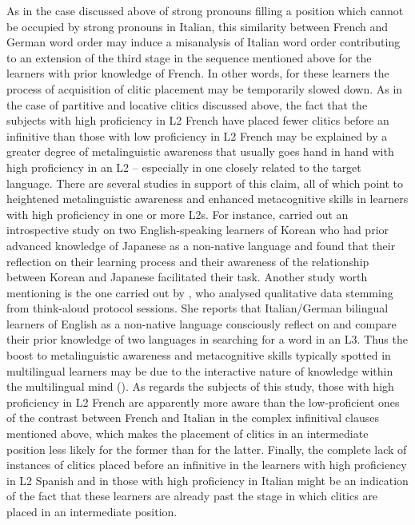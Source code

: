 \documentclass[output=paper,modfonts,nonflat,newtxmath]{langsci/langscibook}
\begin{document}
As in the case discussed above of strong pronouns filling a position which cannot be occupied by strong pronouns in Italian, this similarity between French and German word order may induce a misanalysis of Italian word order contributing to an extension of the third stage in the sequence mentioned above for the learners with prior knowledge of French. In other words, for these learners the process of acquisition of clitic placement may be temporarily slowed down. As in the case of partitive and locative clitics discussed above, the fact that the subjects with high proficiency in L2 French have placed fewer clitics before an infinitive than those with low proficiency in L2 French may be explained by a greater degree of metalinguistic awareness that usually goes hand in hand with high proficiency in an L2 – especially in one closely related to the target language. There are several studies in support of this claim, all of which point to heightened metalinguistic awareness and enhanced metacognitive skills in learners with high proficiency in one or more L2s. For instance, \citet{Fouser2001} carried out an introspective study on two English-speaking learners of Korean who had prior advanced knowledge of Japanese as a non-native language and found that their reflection on their learning process and their awareness of the relationship between Korean and Japanese facilitated their task. Another study worth mentioning is the one carried out by \citet{Jessner1999}, who analysed qualitative data stemming from think-aloud protocol sessions. She reports that Italian/German bilingual learners of English as a non-native language consciously reflect on and compare their prior knowledge of two languages in searching for a word in an L3. Thus the boost to metalinguistic awareness and metacognitive skills typically spotted in multilingual learners may be due to the interactive nature of knowledge within the multilingual mind (\citealt{HerdinaJessner2000, HerdinaJessner2002, Jessner2003, Jessner2008DST, Jessner2008Knowledge, Jessner2009}). As regards the subjects of this study, those with high proficiency in L2 French are apparently more aware than the low-proficient ones of the contrast between French and Italian in the complex infinitival clauses mentioned above, which makes the placement of clitics in an intermediate position less likely for the former than for the latter. Finally, the complete lack of instances of clitics placed before an infinitive in the learners with high proficiency in L2 Spanish and in those with high proficiency in Italian might be an indication of the fact that these learners are already past the stage in which clitics are placed in an intermediate position.
\end{document}
